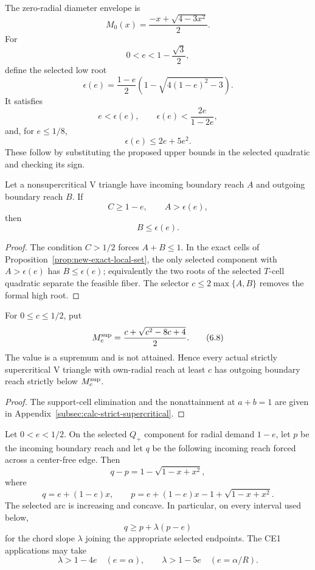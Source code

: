 The zero-radial diameter envelope is
\[
 M_0(x)=\frac{-x+\sqrt{4-3x^2}}2.
 \tag{6.3}
\]
For
\[
 0<e<1-\frac{\sqrt3}{2},
\]
define the selected low root
\[
 \epsilon(e)=\frac{1-e}{2}
 \left(1-\sqrt{4(1-e)^2-3}\right).
 \tag{6.4}
\]
It satisfies
\[
 e<\epsilon(e),\qquad
 \epsilon(e)<\frac{2e}{1-2e},
 \tag{6.5}
\]
and, for $e\le1/8$,
\[
 \epsilon(e)\le2e+5e^2.
 \tag{6.6}
\]
These follow by substituting the proposed upper bounds in the selected
quadratic and checking its sign.

\begin{lemma}
\label{lem:new-direct-threshold}
Let a nonsupercritical V triangle have incoming boundary reach $A$ and
outgoing boundary reach $B$.  If
\[
 C\ge1-e,
 \qquad
 A>\epsilon(e),
\]
then
\[
 \boxed{B\le\epsilon(e).}
 \tag{6.7}
\]
\end{lemma}

\begin{proof}
The condition $C>1/2$ forces $A+B\le1$.  In the exact cells of
Proposition~\ref{prop:new-exact-local-set}, the only selected component with
$A>\epsilon(e)$ has $B\le\epsilon(e)$; equivalently the two roots of the
selected $T$-cell quadratic separate the feasible fiber.  The selector
$c\le2\max\{A,B\}$ removes the formal high root.
\end{proof}

\begin{lemma}
\label{lem:new-strict-supercritical-envelope}
For $0\le c\le1/2$, put
\[
 M_c^{\rm sup}
 =\frac{c+\sqrt{c^2-8c+4}}2.
 \tag{6.8}
\]
The value is a supremum and is not attained.  Hence every actual strictly
supercritical V triangle with own-radial reach at least $c$ has outgoing
boundary reach strictly below $M_c^{\rm sup}$.
\end{lemma}

\begin{proof}
The support-cell elimination and the nonattainment at $a+b=1$ are given in
Appendix~\ref{subsec:calc-strict-supercritical}.
\end{proof}

\begin{lemma}
\label{lem:new-selected-chords}
Let $0<e<1/2$.  On the selected $Q_+$ component for radial demand $1-e$,
let $p$ be the incoming boundary reach and let $q$ be the following incoming
reach forced across a center-free edge.  Then
\[
 q-p=1-\sqrt{1-x+x^2},
\]
where
\[
 q=e+(1-e)x,
 \qquad
 p=e+(1-e)x-1+\sqrt{1-x+x^2}.
 \tag{6.9}
\]
The selected arc is increasing and concave.  In particular, on every interval
used below,
\[
 q\ge p+\lambda(p-e)
 \tag{6.10}
\]
for the chord slope $\lambda$ joining the appropriate selected endpoints.
The CE1 applications may take
\[
 \lambda>1-4e
 \quad(e=\alpha),
 \qquad
 \lambda>1-5e
 \quad(e=\alpha/R).
 \tag{6.11}
\]
\end{lemma}

